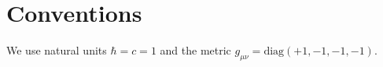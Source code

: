 \section{Conventions}
\label{app:conventions}

We use natural units $\hbar=c=1$ and the metric $g_{\mu\nu}=\mathrm{diag}(+1,-1,-1,-1)$.
